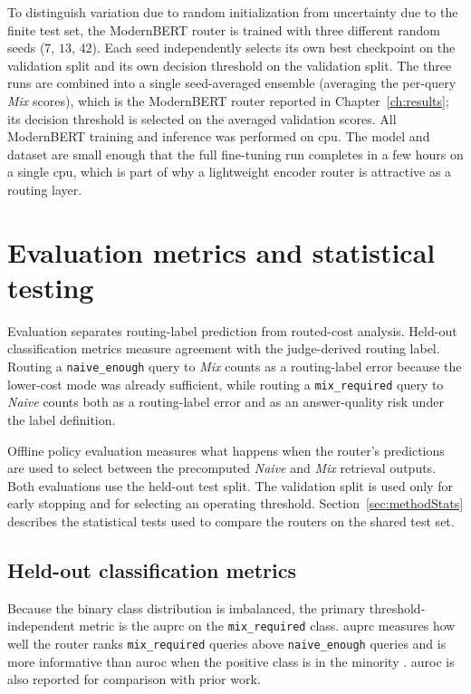 \documentclass[english, bibtex]{kththesis}               %
\numberwithin{listing}{chapter}
\begin{document}
To distinguish variation due to random initialization from uncertainty due to the finite test set, the ModernBERT router is trained with three different random seeds ($7$, $13$, $42$). Each seed independently selects its own best checkpoint on the validation split and its own decision threshold on the validation split. The three runs are combined into a single seed-averaged ensemble (averaging the per-query \emph{Mix} scores), which is the ModernBERT router reported in Chapter~\ref{ch:results}; its decision threshold is selected on the averaged validation scores. All ModernBERT training and inference was performed on \gls{cpu}. The model and dataset are small enough that the full fine-tuning run completes in a few hours on a single \gls{cpu}, which is part of why a lightweight encoder router is attractive as a routing layer.

\section{Evaluation metrics and statistical testing}
\label{sec:methodEvaluation}

Evaluation separates routing-label prediction from routed-cost analysis. Held-out classification metrics measure agreement with the judge-derived routing label. Routing a \texttt{naive\_enough} query to \emph{Mix} counts as a routing-label error because the lower-cost mode was already sufficient, while routing a \texttt{mix\_required} query to \emph{Naive} counts both as a routing-label error and as an answer-quality risk under the label definition.

Offline policy evaluation measures what happens when the router's predictions are used to select between the precomputed \emph{Naive} and \emph{Mix} retrieval outputs. Both evaluations use the held-out test split. The validation split is used only for early stopping and for selecting an operating threshold. Section~\ref{sec:methodStats} describes the statistical tests used to compare the routers on the shared test set.

\subsection{Held-out classification metrics}
\label{sec:methodHeldOut}

Because the binary class distribution is imbalanced, the primary threshold-independent metric is the \gls{auprc} on the \texttt{mix\_required} class. \Gls{auprc} measures how well the router ranks \texttt{mix\_required} queries above \texttt{naive\_enough} queries and is more informative than \gls{auroc} when the positive class is in the minority \cite{saito2015precision}. \Gls{auroc} is also reported for comparison with prior work.
\end{document}
